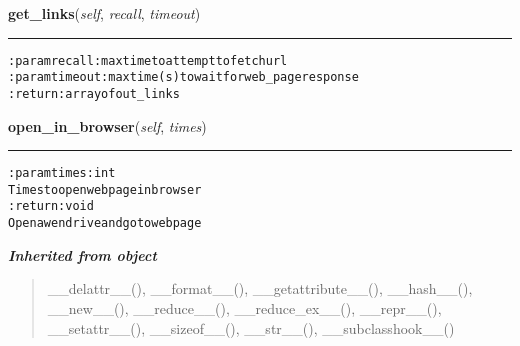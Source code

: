\hspace{.8\funcindent}\begin{boxedminipage}{\funcwidth}

    \raggedright \textbf{get\_links}(\textit{self}, \textit{recall}, \textit{timeout})

    \vspace{-1.5ex}

    \rule{\textwidth}{0.5\fboxrule}
\setlength{\parskip}{2ex}
\begin{alltt}

:param recall: max time to attempt to fetch url
:param timeout: max time (s) to wait for web\_page response
:return: array of out\_links
\end{alltt}

\setlength{\parskip}{1ex}
    \end{boxedminipage}

    \label{hal:internet:web:Webpage:open_in_browser}

    \vspace{0.5ex}

\hspace{.8\funcindent}\begin{boxedminipage}{\funcwidth}

    \raggedright \textbf{open\_in\_browser}(\textit{self}, \textit{times})

    \vspace{-1.5ex}

    \rule{\textwidth}{0.5\fboxrule}
\setlength{\parskip}{2ex}
\begin{alltt}

:param times: int
    Times to open webpage in browser
:return: void
    Open a wendrive and go to webpage
\end{alltt}

\setlength{\parskip}{1ex}
    \end{boxedminipage}


\large{\textbf{\textit{Inherited from object}}}

\begin{quote}
\_\_delattr\_\_(), \_\_format\_\_(), \_\_getattribute\_\_(), \_\_hash\_\_(), \_\_new\_\_(), \_\_reduce\_\_(), \_\_reduce\_ex\_\_(), \_\_repr\_\_(), \_\_setattr\_\_(), \_\_sizeof\_\_(), \_\_str\_\_(), \_\_subclasshook\_\_()
\end{quote}

